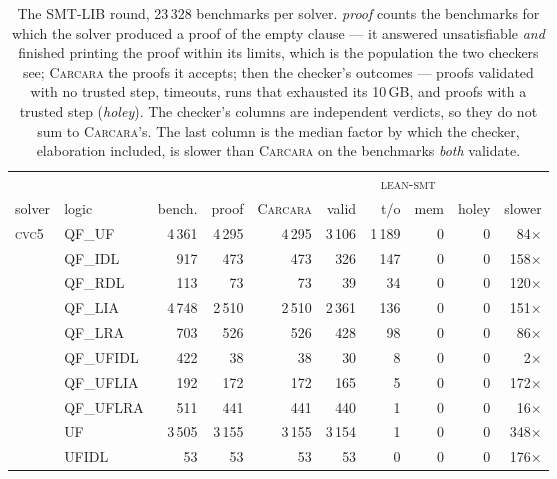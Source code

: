 \documentclass[runningheads]{llncs}
\newcommand{\cvcv}{\textsc{cvc5}\xspace}
\newcommand{\tactic}{\textsc{lean-smt}\xspace}
\newcommand{\carcara}{\textsc{Carcara}\xspace}
\begin{document}
\begin{table}[p]
  \centering
  \caption{The SMT-LIB round, 23\,328 benchmarks per solver. \emph{proof} counts
    the benchmarks for which the solver produced a proof of the empty clause ---
    it answered unsatisfiable \emph{and} finished printing the proof within its
    limits, which is the population the two checkers see; \carcara the proofs it
    accepts; then the checker's outcomes --- proofs validated with no trusted
    step, timeouts, runs that exhausted its 10\,GB, and proofs with a trusted
    step (\emph{holey}). The checker's columns are independent verdicts, so they
    do not sum to \carcara's. The last column is the median factor by which the
    checker, elaboration included, is slower than \carcara on the benchmarks
    \emph{both} validate.}
  \label{tab:smtlib}
  \small
  \setlength{\tabcolsep}{2.6pt}
  \begin{tabular}{l l r r r @{\quad} r r r r @{\quad} r}
    \toprule
    & & & & & \multicolumn{4}{c}{\tactic} & \\
    \cmidrule(lr){6-9}
    solver & logic & bench. & proof & \carcara & valid & t/o & mem & holey & slower \\
    \midrule
    \multirow{13}{*}{\cvcv}
      & QF\_UF    &   4\,361 &   4\,295 &   4\,295 &   3\,106 &  1\,189 &  0 &  0 & 84$\times$ \\
      & QF\_IDL   &      917 &      473 &      473 &      326 &     147 &  0 &  0 & 158$\times$ \\
      & QF\_RDL   &      113 &       73 &       73 &       39 &      34 &  0 &  0 & 120$\times$ \\
      & QF\_LIA   &   4\,748 &   2\,510 &   2\,510 &   2\,361 &     136 &  0 &  0 & 151$\times$ \\
      & QF\_LRA   &      703 &      526 &      526 &      428 &      98 &  0 &  0 & 86$\times$ \\
      & QF\_UFIDL &      422 &       38 &       38 &       30 &       8 &  0 &  0 & 2$\times$ \\
      & QF\_UFLIA &      192 &      172 &      172 &      165 &       5 &  0 &  0 & 172$\times$ \\
      & QF\_UFLRA &      511 &      441 &      441 &      440 &       1 &  0 &  0 & 16$\times$ \\
      & UF        &   3\,505 &   3\,155 &   3\,155 &   3\,154 &       1 &  0 &  0 & 348$\times$ \\
      & UFIDL     &       53 &       53 &       53 &       53 &       0 &  0 &  0 & 176$\times$ \\

\end{tabular}
\end{table}
\end{document}
